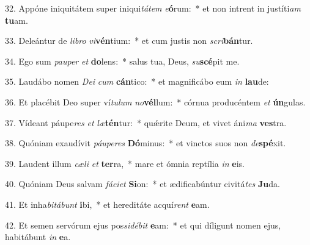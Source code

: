 32. Appóne iniquitátem super iniqui\textit{tá}\textit{tem} \textit{e}\textbf{ó}rum:~*  et non intrent in justíti\textit{am} \textbf{tu}am.\

33. Deleántur de \textit{li}\textit{bro} \textit{vi}\textbf{vén}tium:~*  et cum justis non \textit{scri}\textbf{bán}tur.\

34. Ego sum \textit{pau}\textit{per} \textit{et} \textbf{do}lens:~*  salus tua, Deus, \textit{su}\textbf{scé}pit me.\

35. Laudábo nomen \textit{De}\textit{i} \textit{cum} \textbf{cán}tico:~*  et magnificábo eum \textit{in} \textbf{lau}de:\

36. Et placébit Deo super ví\textit{tu}\textit{lum} \textit{no}\textbf{vél}lum:~*  córnua producéntem \textit{et} \textbf{ún}gulas.\

37. Vídeant páupe\textit{res} \textit{et} \textit{læ}\textbf{tén}tur:~*  quǽrite Deum, et vivet áni\textit{ma} \textbf{ves}tra.\

38. Quóniam exaudívit \textit{páu}\textit{pe}\textit{res} \textbf{Dó}minus:~*  et vinctos suos non \textit{de}\textbf{spé}xit.\

39. Laudent illum \textit{cæ}\textit{li} \textit{et} \textbf{ter}ra,~*  mare et ómnia reptília \textit{in} \textbf{e}is.\

40. Quóniam Deus salvam \textit{fá}\textit{ci}\textit{et} \textbf{Si}on:~*  et ædificabúntur civitá\textit{tes} \textbf{Ju}da.\

41. Et inha\textit{bi}\textit{tá}\textit{bunt} \textbf{i}bi,~*  et hereditáte acquí\textit{rent} \textbf{e}am.\

42. Et semen servórum ejus pos\textit{si}\textit{dé}\textit{bit} \textbf{e}am:~*  et qui díligunt nomen ejus, habitábunt \textit{in} \textbf{e}a.\

